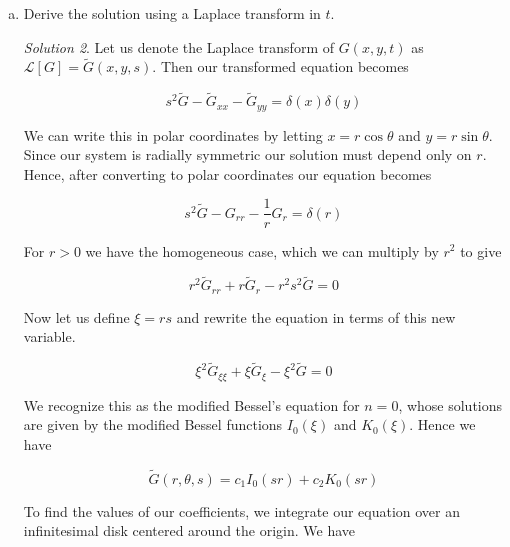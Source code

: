 \documentclass[12pt,a4paper]{article}
\theoremstyle{definition}
\theoremstyle{remark}
\newtheorem*{solution}{Solution}
\begin{document}
\begin{enumerate}[(a)]
\begin{solution}
         However we recall the definition of the Bessel function $J_0$ as 

         $$J_0(x) = \frac{1}{2\pi} \int_{-\pi}^\pi e^{-ix \sin \theta} d\theta$$

         Comparing this with the above expression, we see that 

         $$G(x,y,t) = \frac{1}{2\pi} \int_0^\infty J_0(kr) \sin(kt) dk$$

         Looking this integral up in an integral table, we find our solution to be 

         $$G(x,y,t) = \frac{1}{2\pi} \frac{H(t-r)}{\sqrt{t^2-r^2}},$$

         where $H$ is the Heaviside function.
    \end{solution}

    \item Derive the solution using a Laplace transform in $t$. 
    
    \begin{solution}
        Let us denote the Laplace transform of $G(x,y,t)$ as $\mathcal L[G] = \tilde G(x,y,s)$. Then our transformed equation becomes

        $$s^2 \tilde G - \tilde G_{xx} - \tilde G_{yy} = \delta(x)\delta(y)$$

        We can write this in polar coordinates by letting $x = r \cos \theta$ and $y = r \sin \theta$. Since our system is radially symmetric our solution must depend only on $r$. Hence, after converting to polar coordinates our equation becomes 

        $$s^2 \tilde G - G_{rr} - \frac{1}{r} G_r = \delta(r)$$

        For $r>0$ we have the homogeneous case, which we can multiply by $r^2$ to give 

        $$r^2 \tilde G_{rr} + r \tilde G_r - r^2 s^2 \tilde G = 0$$

        Now let us define $\xi = rs$ and rewrite the equation in terms of this new variable.

        $$\xi^2 \tilde G_{\xi\xi} + \xi \tilde G_\xi - \xi^2 \tilde G = 0$$

        We recognize this as the modified Bessel's equation for $n=0$, whose solutions are given by the modified Bessel functions $I_0(\xi)$ and $K_0(\xi)$. Hence we have

        $$\tilde G(r, \theta, s) = c_1 I_0(sr) + c_2 K_0(sr)$$

        To find the values of our coefficients, we integrate our equation over an infinitesimal disk centered around the origin. We have 


\end{solution}
\end{enumerate}
\end{document}
